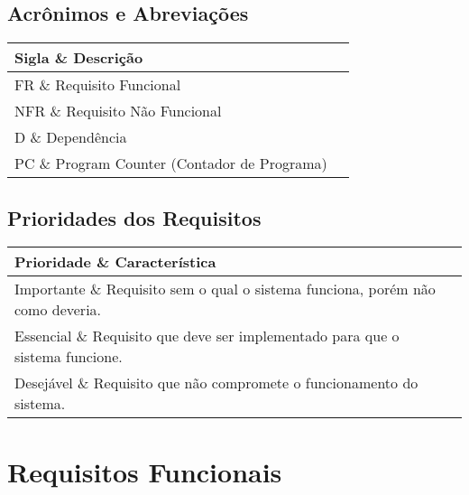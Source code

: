 \documentclass{article}
\begin{document}
  \subsection{Acrônimos e Abreviações}
    \FloatBarrier
    \begin{table}[H]
      \begin{center}
        \begin{tabular}[pos]{|m{2cm} | m{12cm}|}
          \hline
          \cellcolor[gray]{0.9}\textbf{Sigla} \& \cellcolor[gray]{0.9}\textbf{Descrição} \\ \hline
          FR      \& Requisito Funcional  \\ \hline
          NFR     \& Requisito Não Funcional  \\ \hline
          D       \& Dependência  \\ \hline
          PC       \& Program Counter (Contador de Programa)  \\ \hline
        \end{tabular}
      \end{center}
    \end{table}

  \subsection{Prioridades dos Requisitos}
    \FloatBarrier
    \begin{table}[H]
      \begin{center}
        \begin{tabular}[pos]{|m{2cm} | m{12cm}|}
          \hline
          \cellcolor[gray]{0.9}\textbf{Prioridade} \& \cellcolor[gray]{0.9}\textbf{Característica} \\ \hline
          Importante      \& Requisito sem o qual o sistema funciona, porém não como deveria.  \\ \hline
          Essencial       \& Requisito que deve ser implementado para que o sistema funcione.  \\ \hline
          Desejável       \& Requisito que não compromete o funcionamento do sistema.  \\ \hline
        \end{tabular}
      \end{center}
    \end{table}

  \section{Requisitos Funcionais}
\end{document}
